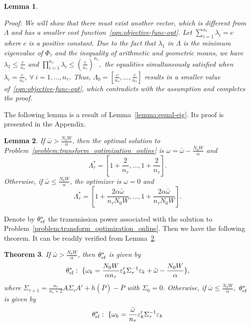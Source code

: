 \documentclass[twocolumn]{autart}    \usepackage{cite}
\newtheorem{theorem}{Theorem}[section]
\newtheorem{lemma}[theorem]{Lemma}
\begin{document}
{{\begin{lemma}
\begin{pf*}{Proof:}
We will show that there must exist another
vector, which is different from $\Lambda$ and has
a smaller cost function~\eqref{eqn:objective-func-opt}.
Let $\sum_{i=1}^{n_\tau}\lambda_i=c$ where
$c$ is a positive constant.
Due to the fact that
$\lambda_1$ in $\Lambda$ is the minimum eigenvalue of
$\Phi_\tau$ and the inequality of arithmetic
and geometric means, we have
$\lambda_1\leq \frac{c}{n_\tau}$ and $\prod_{i=1}^{n_\tau}\lambda_i
\leq \left(\frac{c}{n_\tau}\right)^{n_\tau},$
the equalities simultaneously
satisfied when $\lambda_i=\frac{c}{n_\tau},~\forall~
i=1,\ldots,n_\tau$. Thus, $\Lambda_0=[
{\frac{c}{n_\tau},\ldots,
\frac{c}{n_\tau}}]$ results in a smaller value
of~\eqref{eqn:objective-func-opt}, which
contradicts with the assumption and
completes the proof.
\end{pf*}
\end{lemma}
The following lemma is a result of Lemma~\ref{lemma:equal-eig}. Its proof is
presented in the Appendix.
\begin{lemma}\label{thm:opt-sol}
If $\bar\omega>\frac{N_0W}{\alpha}$, then the optimal
solution to Problem~\ref{problem:transform_optimization_online}
is $\omega=\bar \omega-\frac{N_0W}{\alpha}$ and
\begin{equation}\label{eqn:opt_sol1}
\Lambda_\tau^{*}=
[1+\frac{2}{n_\tau},\ldots, 1+\frac{2}{n_\tau}].
\end{equation}
Otherwise, if $\bar \omega\leq \frac{N_0W}{\alpha}$, the optimizer is $\omega=0$ and
\begin{equation}\label{eqn:opt_sol2}
\Lambda_\tau^{*}=
[1+\frac{2\alpha\bar \omega}{n_\tau N_0W},\ldots, 1+\frac{2\alpha\bar \omega}{n_\tau N_0W}].
\end{equation}
\end{lemma}
Denote by $\theta_{\rm ef}^*$ the transmission power associated with
the solution to Problem~\ref{problem:transform_optimization_online}. Then we have the following theorem. It can be readily
verified from Lemma~\ref{thm:opt-sol}.
\begin{theorem}\label{thm:opt-schedule}
If $\bar\omega>\frac{N_0W}{\alpha}$, then $\theta_{\rm ef}^*$
is given by
$$\theta_{\rm ef}^*:~\{\omega_k
=\frac{N_0W}{\alpha n_\tau}
\varepsilon_k'\Sigma_\tau^{-1}\varepsilon_k
+\bar \omega-\frac{N_0W}{\alpha}\},$$
where
$\Sigma_{\tau+1}=\frac{n_\tau}{n_\tau+2}A
\Sigma_{\tau}A'+h(\overline P)-\overline P$ with $\Sigma_0=0$.
Otherwise, if $\bar \omega\leq \frac{N_0W}{\alpha},$
$\theta_{\rm ef}^*$ is given by
$$\theta_{\rm ef}^*:~\{\omega_k
=\frac{\bar \omega}{n_\tau}
\varepsilon_k'\Sigma_\tau^{-1}\varepsilon_k
$$
\end{theorem}}}
\end{document}
